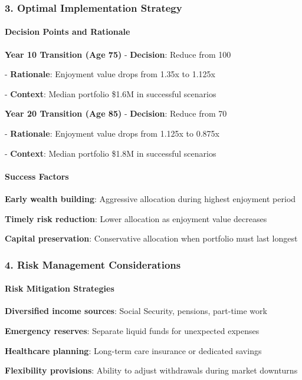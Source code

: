 \documentclass[11pt,letterpaper]{article}
\begin{document}
{{{{{{{{{{{\subsubsection{3. Optimal Implementation Strategy}


\paragraph{Decision Points and Rationale}

\item \textbf{Year 10 Transition (Age 75)}
   - \textbf{Decision}: Reduce from 100%

   - \textbf{Rationale}: Enjoyment value drops from 1.35x to 1.125x

   - \textbf{Context}: Median portfolio \$1.6M in successful scenarios


\item \textbf{Year 20 Transition (Age 85)}
   - \textbf{Decision}: Reduce from 70%

   - \textbf{Rationale}: Enjoyment value drops from 1.125x to 0.875x

   - \textbf{Context}: Median portfolio \$1.8M in successful scenarios


\paragraph{Success Factors}

\item \textbf{Early wealth building}: Aggressive allocation during highest enjoyment period
\item \textbf{Timely risk reduction}: Lower allocation as enjoyment value decreases
\item \textbf{Capital preservation}: Conservative allocation when portfolio must last longest

\subsubsection{4. Risk Management Considerations}


\paragraph{Risk Mitigation Strategies}

\item \textbf{Diversified income sources}: Social Security, pensions, part-time work
\item \textbf{Emergency reserves}: Separate liquid funds for unexpected expenses
\item \textbf{Healthcare planning}: Long-term care insurance or dedicated savings
\item \textbf{Flexibility provisions}: Ability to adjust withdrawals during market downturns

}}}}}}}}}}}
\end{document}
